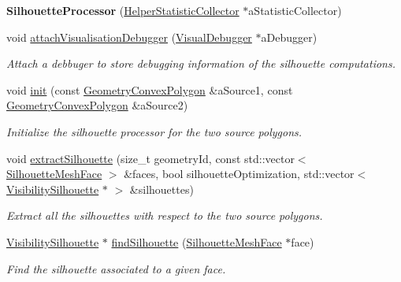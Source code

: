 \begin{DoxyCompactItemize}
\item 
\mbox{\label{classvisilib_1_1_silhouette_processor_a860d9b677347b969cb305265e94c7bf8}} 
{\bfseries Silhouette\+Processor} (\mbox{\hyperlink{classvisilib_1_1_helper_statistic_collector}{Helper\+Statistic\+Collector}} $\ast$a\+Statistic\+Collector)
\item 
\mbox{\label{classvisilib_1_1_silhouette_processor_a9b38305bfb50372badb231710dbd8c41}} 
void \mbox{\hyperlink{classvisilib_1_1_silhouette_processor_a9b38305bfb50372badb231710dbd8c41}{attach\+Visualisation\+Debugger}} (\mbox{\hyperlink{classvisilib_1_1_visual_debugger}{Visual\+Debugger}} $\ast$a\+Debugger)
\begin{DoxyCompactList}\small\item\em Attach a debbuger to store debugging information of the silhouette computations. \end{DoxyCompactList}\item 
\mbox{\label{classvisilib_1_1_silhouette_processor_a8225d6744e57ae62d2f649e50fd4b0a2}} 
void \mbox{\hyperlink{classvisilib_1_1_silhouette_processor_a8225d6744e57ae62d2f649e50fd4b0a2}{init}} (const \mbox{\hyperlink{classvisilib_1_1_geometry_convex_polygon}{Geometry\+Convex\+Polygon}} \&a\+Source1, const \mbox{\hyperlink{classvisilib_1_1_geometry_convex_polygon}{Geometry\+Convex\+Polygon}} \&a\+Source2)
\begin{DoxyCompactList}\small\item\em Initialize the silhouette processor for the two source polygons. \end{DoxyCompactList}\item 
void \mbox{\hyperlink{classvisilib_1_1_silhouette_processor_aecbc9e229dac1bb760f03d889aebd80a}{extract\+Silhouette}} (size\+\_\+t geometry\+Id, const std\+::vector$<$ \mbox{\hyperlink{classvisilib_1_1_silhouette_mesh_face}{Silhouette\+Mesh\+Face}} $>$ \&faces, bool silhouette\+Optimization, std\+::vector$<$ \mbox{\hyperlink{classvisilib_1_1_visibility_silhouette}{Visibility\+Silhouette}} $\ast$ $>$ \&silhouettes)
\begin{DoxyCompactList}\small\item\em Extract all the silhouettes with respect to the two source polygons. \end{DoxyCompactList}\item 
\mbox{\hyperlink{classvisilib_1_1_visibility_silhouette}{Visibility\+Silhouette}} $\ast$ \mbox{\hyperlink{classvisilib_1_1_silhouette_processor_abe945efce3df48005a6927940d16773a}{find\+Silhouette}} (\mbox{\hyperlink{classvisilib_1_1_silhouette_mesh_face}{Silhouette\+Mesh\+Face}} $\ast$face)
\begin{DoxyCompactList}\small\item\em Find the silhouette associated to a given face. \end{DoxyCompactList}\end{DoxyCompactItemize}
